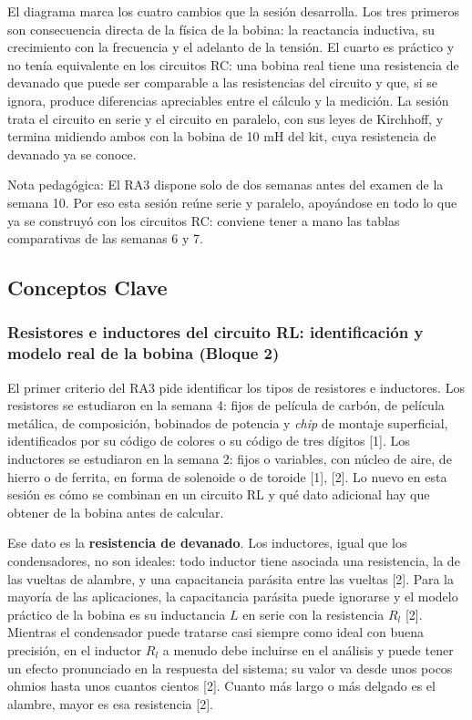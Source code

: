 \documentclass[11pt,letterpaper]{article}
\begin{document}
El diagrama marca los cuatro cambios que la sesión desarrolla. Los tres primeros son consecuencia directa de la física de la bobina: la reactancia inductiva, su crecimiento con la frecuencia y el adelanto de la tensión. El cuarto es práctico y no tenía equivalente en los circuitos RC: una bobina real tiene una resistencia de devanado que puede ser comparable a las resistencias del circuito y que, si se ignora, produce diferencias apreciables entre el cálculo y la medición. La sesión trata el circuito en serie y el circuito en paralelo, con sus leyes de Kirchhoff, y termina midiendo ambos con la bobina de 10 mH del kit, cuya resistencia de devanado ya se conoce.

\begin{nota}{Nota pedagógica:}
El RA3 dispone solo de dos semanas antes del examen de la semana 10. Por eso esta sesión reúne serie y paralelo, apoyándose en todo lo que ya se construyó con los circuitos RC: conviene tener a mano las tablas comparativas de las semanas 6 y 7.
\end{nota}

\subsection{Conceptos Clave}

\subsubsection{Resistores e inductores del circuito RL: identificación y modelo real de la bobina (Bloque 2)}

El primer criterio del RA3 pide identificar los tipos de resistores e inductores. Los resistores se estudiaron en la semana 4: fijos de película de carbón, de película metálica, de composición, bobinados de potencia y \textit{chip} de montaje superficial, identificados por su código de colores o su código de tres dígitos [1]. Los inductores se estudiaron en la semana 2: fijos o variables, con núcleo de aire, de hierro o de ferrita, en forma de solenoide o de toroide [1], [2]. Lo nuevo en esta sesión es cómo se combinan en un circuito RL y qué dato adicional hay que obtener de la bobina antes de calcular.

Ese dato es la \textbf{resistencia de devanado}. Los inductores, igual que los condensadores, no son ideales: todo inductor tiene asociada una resistencia, la de las vueltas de alambre, y una capacitancia parásita entre las vueltas [2]. Para la mayoría de las aplicaciones, la capacitancia parásita puede ignorarse y el modelo práctico de la bobina es su inductancia $L$ en serie con la resistencia $R_l$ [2]. Mientras el condensador puede tratarse casi siempre como ideal con buena precisión, en el inductor $R_l$ a menudo debe incluirse en el análisis y puede tener un efecto pronunciado en la respuesta del sistema; su valor va desde unos pocos ohmios hasta unos cuantos cientos [2]. Cuanto más largo o más delgado es el alambre, mayor es esa resistencia [2].
\end{document}
